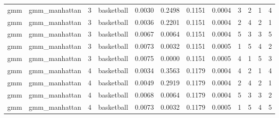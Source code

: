 \documentclass[
]{article}
\begin{document}
\begin{longtable}{| p{1.1cm} | p{2cm} | p{0.8cm} | p{1.3cm} | p{0.60cm} | p{0.7cm} | p{0.65cm} | p{0.65cm} | p{0.65cm} | p{0.65cm} | p{0.7cm} | p{0.65cm} |}
\cline{2-12}
\scriptsize     gmm   & \scriptsize    gmm\_manhattan & \scriptsize    3    & \scriptsize basketball & \scriptsize    0.0030  &  \scriptsize 0.2498 & \scriptsize 0.1151 & \scriptsize    0.0004 & \scriptsize   3  & \scriptsize    2  & \scriptsize    1  & \scriptsize    4 \\
\scriptsize     gmm   & \scriptsize    gmm\_manhattan & \scriptsize    3    & \scriptsize basketball & \scriptsize    0.0036  &  \scriptsize 0.2201 & \scriptsize 0.1151 & \scriptsize    0.0004 & \scriptsize   2  & \scriptsize    4  & \scriptsize    2  & \scriptsize    1 \\
\scriptsize     gmm   & \scriptsize    gmm\_manhattan & \scriptsize    3    & \scriptsize basketball & \scriptsize    0.0067  &  \scriptsize 0.0064 & \scriptsize 0.1151 & \scriptsize    0.0004 & \scriptsize   5  & \scriptsize    3  & \scriptsize    3  & \scriptsize    5 \\
\scriptsize     gmm   & \scriptsize    gmm\_manhattan & \scriptsize    3    & \scriptsize basketball & \scriptsize    0.0073  &  \scriptsize 0.0032 & \scriptsize 0.1151 & \scriptsize    0.0005 & \scriptsize   1  & \scriptsize    5  & \scriptsize    4  & \scriptsize    2 \\
\scriptsize     gmm   & \scriptsize    gmm\_manhattan & \scriptsize    3    & \scriptsize basketball & \scriptsize    0.0075  &  \scriptsize 0.0000 & \scriptsize 0.1151 & \scriptsize    0.0005 & \scriptsize   4  & \scriptsize    1  & \scriptsize    5  & \scriptsize    3 \\
\cline{3-12}
\scriptsize     gmm   & \scriptsize    gmm\_manhattan & \scriptsize    4    & \scriptsize basketball & \scriptsize    0.0034  &  \scriptsize 0.3563 & \scriptsize 0.1179 & \scriptsize    0.0004 & \scriptsize   4  & \scriptsize    2  & \scriptsize    1  & \scriptsize    4 \\
\scriptsize     gmm   & \scriptsize    gmm\_manhattan & \scriptsize    4    & \scriptsize basketball & \scriptsize    0.0049  &  \scriptsize 0.2919 & \scriptsize 0.1179 & \scriptsize    0.0004 & \scriptsize   2  & \scriptsize    4  & \scriptsize    2  & \scriptsize    1 \\
\scriptsize     gmm   & \scriptsize    gmm\_manhattan & \scriptsize    4    & \scriptsize basketball & \scriptsize    0.0068  &  \scriptsize 0.0064 & \scriptsize 0.1179 & \scriptsize    0.0004 & \scriptsize   5  & \scriptsize    3  & \scriptsize    3  & \scriptsize    2 \\
\scriptsize     gmm   & \scriptsize    gmm\_manhattan & \scriptsize    4    & \scriptsize basketball & \scriptsize    0.0073  &  \scriptsize 0.0032 & \scriptsize 0.1179 & \scriptsize    0.0005 & \scriptsize   1  & \scriptsize    5  & \scriptsize    4  & \scriptsize    5 \\

\end{longtable}
\end{document}
